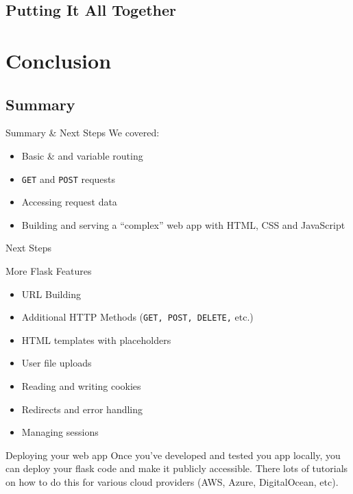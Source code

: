 \documentclass{beamer}
\begin{document}
\subsection{Putting It All Together}


\section{Conclusion}

\subsection{Summary}
	\begin{frame}[t]{Summary \& Next Steps}
		We covered:
		\begin{itemize}
			\item{Basic \& and variable routing}
			\item{\texttt{GET} and \texttt{POST} requests}
			\item{Accessing request data}
			\item{Building and serving a ``complex'' web app with HTML, CSS and
					JavaScript}
		\end{itemize}
	\end{frame}


	\begin{frame}[t]{Next Steps}
		\begin{block}{More Flask Features}
			\begin{itemize}
				\item{URL Building}
				\item{Additional HTTP Methods (\texttt{GET, POST, DELETE,} etc.)}
				\item{HTML templates with placeholders}
				\item{User file uploads}
				\item{Reading and writing cookies}
				\item{Redirects and error handling}
				\item{Managing sessions}
			\end{itemize}
		\end{block}
		\pause

		\begin{block}{Deploying your web app}
			Once you've developed and tested you app locally, you can deploy
			your flask code and make it publicly accessible. There lots of
			tutorials on how to do this for various cloud providers (AWS,
			Azure, DigitalOcean, etc).
		\end{block}
	\end{frame}
\end{document}
